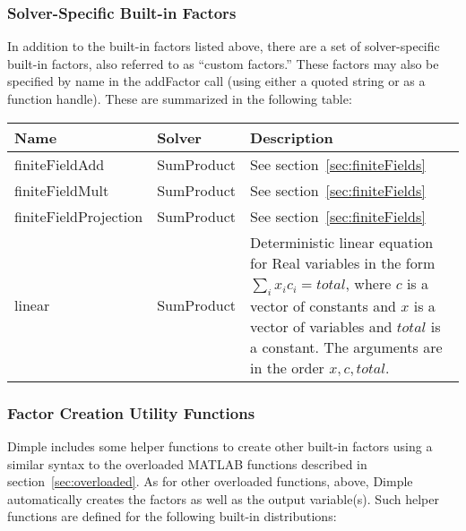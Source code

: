 \subsubsection{Solver-Specific Built-in Factors}
\label{sec:solverSpecificBuiltInFactors}

In addition to the built-in factors listed above, there are a set of solver-specific built-in factors, also referred to as ``custom factors.''  These factors may also be specified by name in the addFactor call (using either a quoted string or as a function handle).  These are summarized in the following table:

\begin{longtable} {l p{3cm} p{7cm}}
Name & Solver & Description \\
\hline
\endhead
%
finiteFieldAdd & SumProduct & See section~\ref{sec:finiteFields} \\ 
finiteFieldMult & SumProduct & See section~\ref{sec:finiteFields} \\ 
finiteFieldProjection & SumProduct & See section~\ref{sec:finiteFields} \\ 
linear & SumProduct & Deterministic linear equation for Real variables in the form $\sum_i x_i c_i = total$, where $c$ is a vector of constants and $x$ is a vector of variables and $total$ is a constant. The arguments are in the order $x, c, total$. \\
\end{longtable}


\ifmatlab
\subsubsection{Factor Creation Utility Functions}

Dimple includes some helper functions to create other built-in factors using a similar syntax to the overloaded MATLAB functions described in section~\ref{sec:overloaded}.  As for other overloaded functions, above, Dimple automatically creates the factors as well as the output variable(s).  Such helper functions are defined for the following built-in distributions:

